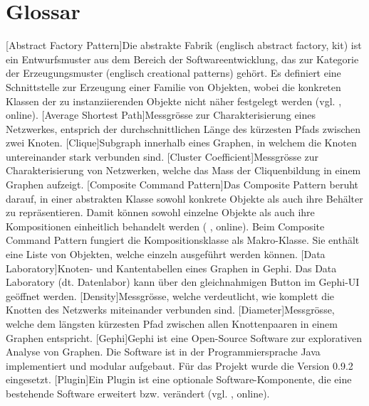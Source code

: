 \chapter*{Glossar}

\begin{acronym}
    [Abstract Factory Pattern]{Die abstrakte Fabrik (englisch abstract factory, kit) ist ein Entwurfsmuster aus dem Bereich der Softwareentwicklung, das zur Kategorie der Erzeugungsmuster (englisch creational patterns) gehört. Es definiert eine Schnittstelle zur Erzeugung einer Familie von Objekten, wobei die konkreten Klassen der zu instanziierenden Objekte nicht näher festgelegt werden (vgl. \citeauthor{wikipedia_abstrakte_2018} \citeyear{wikipedia_abstrakte_2018}, online).}
    [Average Shortest Path]{Messgrösse zur Charakterisierung eines Netzwerkes, entsprich der durchschnittlichen Länge des kürzesten Pfads zwischen zwei Knoten.}
    [Clique]{Subgraph innerhalb eines Graphen, in welchem die Knoten untereinander stark verbunden sind.}
    [Cluster Coefficient]{Messgrösse zur Charakterisierung von Netzwerken, welche das Mass der Cliquenbildung in einem Graphen aufzeigt.}
    [Composite Command Pattern]{Das Composite Pattern beruht darauf, in einer abstrakten Klasse sowohl konkrete Objekte als auch ihre Behälter zu repräsentieren. Damit können sowohl einzelne Objekte als auch ihre Kompositionen einheitlich behandelt werden (\citeauthor{wikipedia_kompositum_2019} \citeyear{wikipedia_kompositum_2019}, online). Beim Composite Command Pattern fungiert die Kompositionsklasse als Makro-Klasse. Sie enthält eine Liste von Objekten, welche einzeln ausgeführt werden können.}
    [Data Laboratory]{Knoten- und Kantentabellen eines Graphen in Gephi. Das Data Laboratory (dt. Datenlabor) kann über den gleichnahmigen Button im Gephi-UI geöffnet werden.}
    [Density]{Messgrösse, welche verdeutlicht, wie komplett die Knotten des Netzwerks miteinander verbunden sind.}
    [Diameter]{Messgrösse, welche dem längsten kürzesten Pfad zwischen allen Knottenpaaren in einem Graphen entspricht.}
    [Gephi]{Gephi ist eine Open-Source Software zur explorativen
    Analyse von Graphen. Die Software ist in der Programmiersprache Java implementiert
    und modular aufgebaut. Für das Projekt wurde die Version 0.9.2 eingesetzt.}
    [Plugin]{Ein Plugin ist eine optionale Software-Komponente, die eine bestehende Software erweitert bzw. verändert (vgl. \citeauthor{wikipedia_plug-_2019} \citeyear{wikipedia_plug-_2019}, online).}

\end{acronym}
